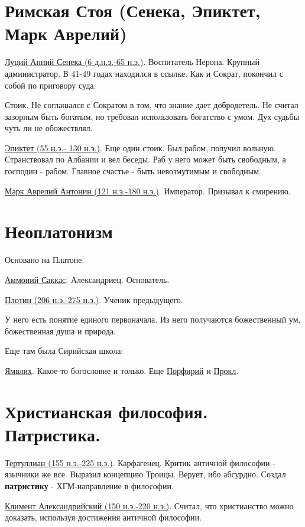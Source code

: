 \documentclass[12pt,a4paper]{article}
\begin{document}
\section{Римская Стоя (Сенека, Эпиктет, Марк Аврелий)}

\underline{Луций Анний Сенека  (6 д.н.э.-65 н.э.)}. Воспитатель Нерона. Крупный администратор. В 41-49 годах находился в ссылке. Как и Сократ, покончил с собой по приговору суда.

Стоик. Не соглашался с Сократом в том, что знание дает добродетель. Не считал зазорным быть богатым, но требовал использовать богатство с умом. Дух судьбы чуть ли не обожествлял.

\underline{Эпиктет (55 н.э.- 130 н.э.)}. Еще один стоик. Был рабом, получил вольную. Странствовал по Албании и вел беседы. Раб у него может быть свободным, а господин - рабом. Главное счастье - быть невозмутимым и свободным.

\underline{Марк Аврелий Антонин (121 н.э.-180 н.э.)}. Император. Призывал к смирению.


\section{Неоплатонизм}

Основано на Платоне.

\underline{Аммоний Саккас}. Александриец. Основатель.

\underline{Плотин (206 н.э.-275 н.э.)}. Ученик предыдущего. 

У него есть понятие единого первоначала. Из него получаются божественный ум, божественная душа и природа.

Еще там была Сирийская школа:

\underline{Ямвлих}. Какое-то богословие и только. Еще \underline{Порфирий} и \underline{Прокл}.


\section{Христианская философия. Патристика.}

\underline{Тертуллиан (155 н.э.-225 н.э.)}. Карфагенец. Критик античной философии - язычники же все. Выразил концепцию Троицы. Верует, ибо абсурдно. Создал \textbf{патристику} - ХГМ-направление в философии.

\underline{Климент Александрийский (150 н.э.-220 н.э.)}. Считал, что христианство можно доказать, используя достижения античной философии.
\end{document}
